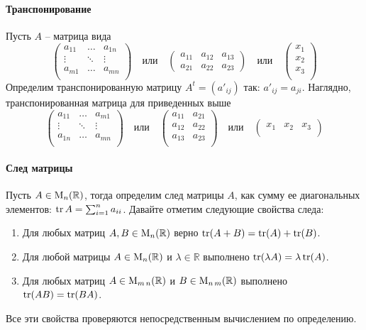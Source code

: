 \paragraph{Транспонирование}

Пусть $A$ -- матрица вида
\[
\begin{pmatrix}
{a_{11}}&{\ldots}&{a_{1n}}\\
{\vdots}&{\ddots}&{\vdots}\\
{a_{m1}}&{\ldots}&{a_{mn}}\\
\end{pmatrix}\quad \text{или}\quad
\begin{pmatrix}
{a_{11}}&{a_{12}}&{a_{13}}\\
{a_{21}}&{a_{22}}&{a_{23}}
\end{pmatrix}\quad \text{или}\quad
\begin{pmatrix}
{x_1}\\
{x_2}\\
{x_3}\\
\end{pmatrix}
\]
Определим транспонированную матрицу $A^t = (a'_{ij})$ так: $a'_{ij} = a_{ji}$.
Наглядно, транспонированная матрица для приведенных выше
\[
\begin{pmatrix}
{a_{11}}&{\ldots}&{a_{m1}}\\
{\vdots}&{\ddots}&{\vdots}\\
{a_{1n}}&{\ldots}&{a_{mn}}\\
\end{pmatrix}\quad\text{или}\quad
\begin{pmatrix}
{a_{11}}&{a_{21}}\\
{a_{12}}&{a_{22}}\\
{a_{13}}&{a_{23}}\\
\end{pmatrix}\quad \text{или}\quad
\begin{pmatrix}
{x_1}&{x_2}&{x_3}\\
\end{pmatrix}
\]

\paragraph{След матрицы}

Пусть $A\in\operatorname{M}_{n}(\mathbb R)$, тогда определим след матрицы $A$, как сумму ее диагональных элементов: $\operatorname{tr} A = \sum_{i=1}^n a_{ii}$.
Давайте отметим следующие свойства следа:
\begin{enumerate}
\item Для любых матриц $A, B\in \operatorname{M}_{n}(\mathbb R)$ верно $\operatorname{tr}(A + B) = \operatorname{tr}(A) + \operatorname{tr}(B)$.

\item Для любой матрицы $A\in \operatorname{M}_{n}(\mathbb R)$ и $\lambda \in \mathbb R$ выполнено $\operatorname{tr}(\lambda A) = \lambda \operatorname{tr}(A)$.

\item Для любых матриц $A\in \operatorname{M}_{m\,n}(\mathbb R)$ и $B\in \operatorname{M}_{n\,m}(\mathbb R)$ выполнено $\operatorname{tr}(AB) = \operatorname{tr}(BA)$.
\end{enumerate}
Все эти свойства проверяются непосредственным вычислением по определению.

